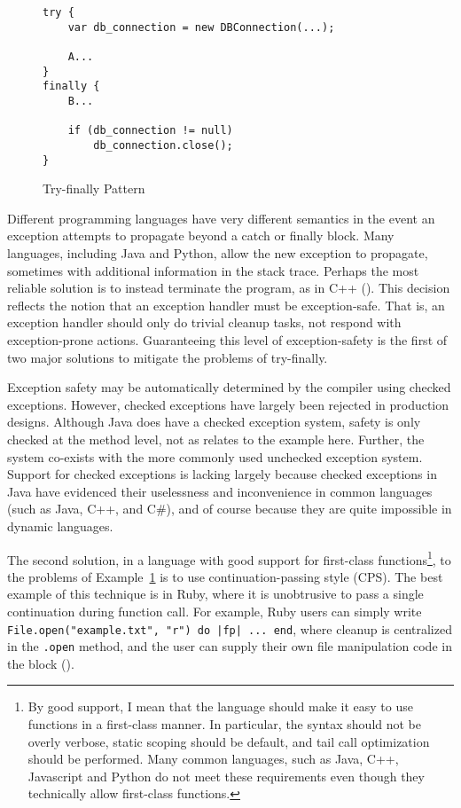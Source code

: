 \documentclass[11pt]{article}
\begin{document}
\begin{figure}[H]
\caption{Try-finally Pattern}
\label{tryPattern}
\begin{verbatim}
try {  
    var db_connection = new DBConnection(...);

    A...
}
finally {
    B...

    if (db_connection != null)
        db_connection.close();
}
\end{verbatim}
\end{figure}

Different programming languages have very different semantics in the event an exception attempts to propagate beyond a catch or finally block.
Many languages, including Java and Python, allow the new exception to propagate, sometimes with additional information in the stack trace.
Perhaps the most reliable solution is to instead terminate the program, as in C++ (\cite{evolutionCplusplus}).
This decision reflects the notion that an exception handler must be exception-safe.
That is, an exception handler should only do trivial cleanup tasks, not respond with exception-prone actions.
Guaranteeing this level of exception-safety is the first of two major solutions to mitigate the problems of try-finally.

Exception safety may be automatically determined by the compiler using checked exceptions.
However, checked exceptions have largely been rejected in production designs.
Although Java does have a checked exception system, safety is only checked at the method level, not as relates to the example here.
Further, the system co-exists with the more commonly used unchecked exception system.
Support for checked exceptions is lacking largely because checked exceptions in Java have evidenced their uselessness and inconvenience in common languages (such as Java, C++, and C\#), and of course because they are quite impossible in dynamic languages.

The second solution, in a language with good support for first-class functions\footnote{By good support, I mean that the language should make it easy to use functions in a first-class manner. In particular, the syntax should not be overly verbose, static scoping should be default, and tail call optimization should be performed. Many common languages, such as Java, C++, Javascript and Python do not meet these requirements even though they technically allow first-class functions.}, to the problems of Example~\ref{tryPattern} is to use continuation-passing style (CPS).
The best example of this technique is in Ruby, where it is unobtrusive to pass a single continuation during function call.
For example, Ruby users can simply write \texttt{File.open("example.txt", "r") do |fp| ... end}, where cleanup is centralized in the \texttt{.open} method, and the user can supply their own file manipulation code in the block (\cite{programmingRuby}).
\end{document}
